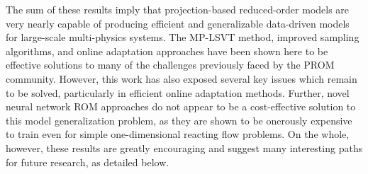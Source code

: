 The sum of these results imply that projection-based reduced-order models are very nearly capable of producing efficient and generalizable data-driven models for large-scale multi-physics systems. The MP-LSVT method, improved sampling algorithms, and online adaptation approaches have been shown here to be effective solutions to many of the challenges previously faced by the PROM community. However, this work has also exposed several key issues which remain to be solved, particularly in efficient online adaptation methods. Further, novel neural network ROM approaches do not appear to be a cost-effective solution to this model generalization problem, as they are shown to be onerously expensive to train even for simple one-dimensional reacting flow problems. On the whole, however, these results are greatly encouraging and suggest many interesting paths for future research, as detailed below.